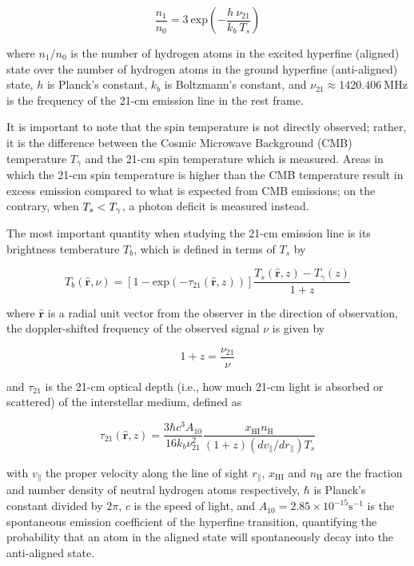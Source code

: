 \documentclass[floats,floatfix,showpacs,amssymb,prd,superscriptaddress,nofootinbib]{revtex4-2} %
\newcommand{\lt}{\ensuremath <}
\begin{document}
\begin{equation}
    \frac{n_1}{n_0} = 3 ~ \text{exp} \left( -\frac{h ~ \nu_{21}}{k_b ~ T_s} \right)
\end{equation}

\noindent where $n_1/n_0$ is the number of hydrogen atoms in the excited hyperfine (aligned) state over the number of hydrogen atoms in the ground hyperfine (anti-aligned) state, $h$ is Planck's constant, $k_b$ is Boltzmann's constant, and $\nu_{21} \approx 1420.406 ~\text{MHz}$ is the frequency of the 21-cm emission line in the rest frame. 

It is important to note that the spin temperature is not directly observed; rather, it is the difference between the Cosmic Microwave Background (CMB) temperature $T_\gamma$ and the 21-cm spin temperature which is measured. Areas in which the 21-cm spin temperature is higher than the CMB temperature result in excess emission compared to what is expected from CMB emissions; on the contrary, when $T_s \lt T_\gamma$, a photon deficit is measured instead.

The most important quantity when studying the 21-cm emission line is its brightness temberature $T_b$, which is defined in terms of $T_s$ by 

\begin{equation}
    T_b (\hat{\textbf{r}}, \nu) = \left[1 - \text{exp}(-\tau_{21}(\hat{\textbf{r}}, z)) \right] \frac{T_s(\hat{\textbf{r}}, z) - T_\gamma (z)}{1 + z}
\end{equation}

\noindent where $\hat{\textbf{r}}$ is a radial unit vector from the observer in the direction of observation, the doppler-shifted frequency of the observed signal $\nu$ is given by 

\begin{equation}
    1 + z = \frac{\nu_{21}}{\nu}
\end{equation}

\noindent and $\tau_{21}$ is the 21-cm optical depth (i.e., how much 21-cm light is absorbed or scattered) of the interstellar medium, defined as

\begin{equation}
    \tau_{21} (\hat{\textbf{r}}, z) = \frac{3 \hbar c^3 A_{10}}{16 k_b \nu^2_{21}} \frac{x_{\mathrm{HI}} n_\mathrm{H}}{(1 + z) (dv_{\parallel} / dr_{\parallel}) T_s}
\end{equation}

\noindent with $v_\parallel$ the proper velocity along the line of sight $r_\parallel$, $x_{\mathrm{HI}}$ and $n_{\mathrm{H}}$ are the fraction and number density of neutral hydrogen atoms respectively, $\hbar$ is Planck's constant divided by $2\pi$, $c$ is the speed of light, and $A_{10} = 2.85 \times 10^{-15} \text{s}^{-1}$ is the spontaneous emission coefficient of the hyperfine transition, quantifying the probability that an atom in the aligned state will spontaneously decay into the anti-aligned state. 
\end{document}

